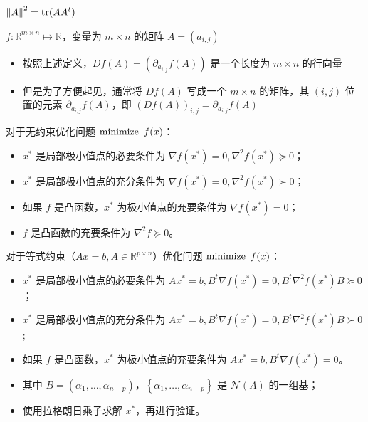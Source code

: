 \begin{remark}
	$\norm{A}^2 = \tr(AA^t)$
\end{remark}

\begin{remark}
    $f: \mathbb{R}^{m \times n} \mapsto \mathbb{R}$，变量为 $m \times n$ 的矩阵 $A = (a_{i, j})$\begin{itemize}
        \item 按照上述定义，$Df(A) = (\partial_{a_{i, j}}f(A))$ 是一个长度为 $m \times n$ 的行向量
        \item 但是为了方便起见，通常将 $Df(A)$ 写成一个 $m \times n$ 的矩阵，其 $(i, j)$ 位置的元素 $\partial_{a_{i, j}}f(A)$，即 $(Df(A))_{i, j} = \partial_{a_{i, j}}f(A)$
    \end{itemize}
\end{remark}

\begin{remark}
	对于无约束优化问题 $\minimize\ f(x)$：
	\begin{itemize}
		\item $x^*$ 是局部极小值点的必要条件为 $\nabla f(x^*) = 0, \nabla^2f(x^*)\succeq 0$；
		\item $x^*$ 是局部极小值点的充分条件为 $\nabla f(x^*) = 0, \nabla^2f(x^*)\succ 0$；
		\item 如果 $f$ 是凸函数，$x^*$ 为极小值点的充要条件为 $\nabla f(x^*) = 0$；
		\item $f$ 是凸函数的充要条件为 $\nabla^2f\succeq 0$。
	\end{itemize}
\end{remark}

\begin{remark}
	对于等式约束（$Ax=b, A\in \mathbb{R}^{p\times n}$）优化问题 $\minimize\ f(x)$：
	\begin{itemize}
		\item $x^*$ 是局部极小值点的必要条件为 $Ax^*=b, B^t\nabla f(x^*) = 0, B^t\nabla^2f(x^*)B \succeq 0$；
		\item $x^*$ 是局部极小值点的充分条件为 $Ax^*=b, B^t\nabla f(x^*) = 0, B^t\nabla^2f(x^*)B \succ 0$;
		\item 如果 $f$ 是凸函数，$x^*$ 为极小值点的充要条件为 $Ax^*=b, B^t\nabla f(x^*) = 0$。
		\item 其中 $B=(\alpha_1, \dots, \alpha_{n - p})$，$\left\{\alpha_1, \dots, \alpha_{n - p}\right\}$ 是 $\mathcal{N}(A)$ 的一组基；
		\item 使用拉格朗日乘子求解 $x^*$，再进行验证。
	\end{itemize}
\end{remark}

